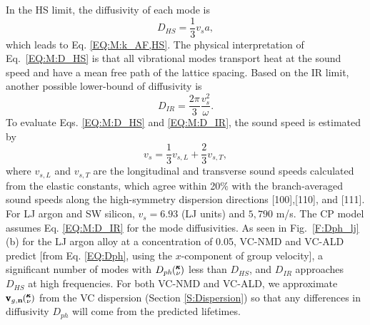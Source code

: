 \documentclass[12pt,twocolumn,iop]{/usr/share/texmf/tex/latex/iop/iopart}[/usr/share/texmf/tex/latex/iop/]
\newcommand{\kv}{\mspace{-4.0mu}\left(\mspace{-8.0mu}
\begin{smallmatrix}&\pmb{\kappa} \\&\nu\end{smallmatrix}
\mspace{-3.0mu}\right)}
\begin{document}
In the HS limit,\cite{cahill_lattice_1988} 
the diffusivity of each mode is
\begin{equation}\label{EQ:M:D_HS}
D_{HS} = \frac{1}{3} v_s a,
\end{equation}
which leads to Eq. \eqref{EQ:M:k_AF,HS}. 
The physical interpretation of Eq.~\eqref{EQ:M:D_HS} 
is that all vibrational modes transport heat at the sound speed 
and have a mean free path of the lattice spacing. 
Based on the IR limit, another possible lower-bound of 
diffusivity is  
\begin{equation}\label{EQ:M:D_IR}
D_{IR} = \frac{2\pi}{3} \frac{v^2_s}{\omega}. 
\end{equation} 
To evaluate Eqs. \eqref{EQ:M:D_HS} and \eqref{EQ:M:D_IR}, 
the sound speed is estimated by 
\begin{equation}\label{EQ:M:vs}
v_s = \frac{1}{3}v_{s,L} + \frac{2}{3}v_{s,T},
\end{equation}
where $v_{s,L}$ and $v_{s,T}$ are the longitudinal and transverse 
sound speeds calculated from the elastic constants,
\cite{gale_general_2003} which agree within 20$\%$ with the 
branch-averaged sound speeds along the high-symmetry dispersion 
directions [100],[110], and [111]. For LJ argon and SW silicon, 
$v_s = 6.93$ (LJ units) and $5,790$ m/s. 
The CP model assumes Eq. \eqref{EQ:M:D_IR} for the mode 
diffusivities.\cite{cahill_lattice_1988} 
As seen in Fig.~\ref{F:Dph_lj}(b) for the LJ argon alloy at 
a concentration of 0.05, VC-NMD and VC-ALD predict [from 
Eq. \eqref{EQ:Dph}, using the $x$-component of group velocity], a 
significant number of modes with  
$D_{ph}\kv$ less than $D_{HS}$, and $D_{IR}$ approaches $D_{HS}$ at 
high frequencies. For both VC-NMD and VC-ALD, we 
approximate $\pmb{\text{v}}_{g,\mathbf{n}}\kv$ from the VC dispersion 
(Section \ref{S:Dispersion}) so that any differences in 
diffusivity $D_{ph}$ will come from the predicted lifetimes.  
\end{document}
